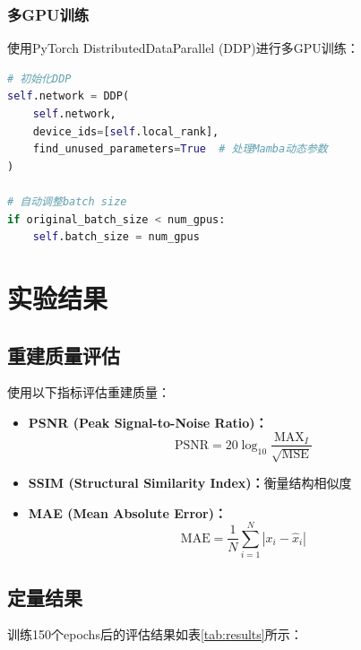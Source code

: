 \documentclass[11pt,a4paper]{article}
\begin{document}
\subsubsection{多GPU训练}

使用PyTorch DistributedDataParallel (DDP)进行多GPU训练：

\begin{lstlisting}[language=Python, caption=DDP训练配置]
# 初始化DDP
self.network = DDP(
    self.network,
    device_ids=[self.local_rank],
    find_unused_parameters=True  # 处理Mamba动态参数
)

# 自动调整batch size
if original_batch_size < num_gpus:
    self.batch_size = num_gpus
\end{lstlisting}

\section{实验结果}

\subsection{重建质量评估}

使用以下指标评估重建质量：

\begin{itemize}
    \item \textbf{PSNR (Peak Signal-to-Noise Ratio)：}
    \begin{equation}
        \text{PSNR} = 20 \log_{10} \frac{\text{MAX}_I}{\sqrt{\text{MSE}}}
    \end{equation}

    \item \textbf{SSIM (Structural Similarity Index)：}衡量结构相似度

    \item \textbf{MAE (Mean Absolute Error)：}
    \begin{equation}
        \text{MAE} = \frac{1}{N}\sum_{i=1}^N |x_i - \hat{x}_i|
    \end{equation}
\end{itemize}

\subsection{定量结果}

训练150个epochs后的评估结果如表\ref{tab:results}所示：
\end{document}
